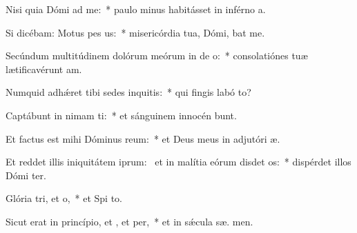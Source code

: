 \item Nisi quia Dómi ad me:~* paulo minus habitásset in inférno  a.
\item Si dicébam: Motus  pes us:~* misericórdia tua, Dómi, bat me.
\item Secúndum multitúdinem dolórum meórum in de o:~* consolatiónes tuæ lætificavérunt  am.
\item Numquid adhǽret tibi sedes inquitis:~* qui fingis labó  to?
\item Captábunt in nimam ti:~* et sánguinem innocén bunt.
\item Et factus est mihi Dóminus  reum:~* et Deus meus in adjutóri  æ.
\item Et reddet illis iniquitátem iprum:~\pscross{} et in malítia eórum disdet os:~* dispérdet illos Dómi  ter.
\item Glória tri, et o,~* et Spi to.
\item Sicut erat in princípio, et , et per,~* et in sǽcula sæ. men.

